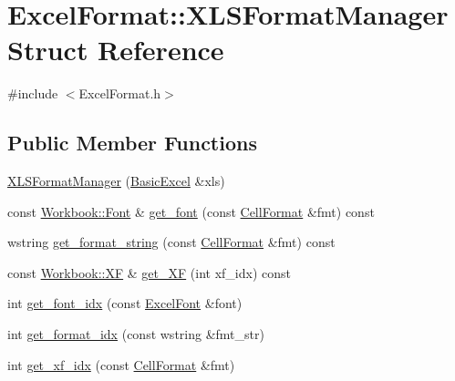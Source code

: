 \hypertarget{struct_excel_format_1_1_x_l_s_format_manager}{}\section{Excel\+Format\+:\+:X\+L\+S\+Format\+Manager Struct Reference}
\label{struct_excel_format_1_1_x_l_s_format_manager}


{\ttfamily \#include $<$Excel\+Format.\+h$>$}

\subsection*{Public Member Functions}
\begin{DoxyCompactItemize}
\item 
\hyperlink{struct_excel_format_1_1_x_l_s_format_manager_af1e5bd0c7eab2aac1d2b4c3cd59f573c}{X\+L\+S\+Format\+Manager} (\hyperlink{class_y_excel_1_1_basic_excel}{Basic\+Excel} \&xls)
\item 
const \hyperlink{struct_y_excel_1_1_workbook_1_1_font}{Workbook\+::\+Font} \& \hyperlink{struct_excel_format_1_1_x_l_s_format_manager_ab6fd9d6dbade5f35a21ee8d38bda32ec}{get\+\_\+font} (const \hyperlink{struct_excel_format_1_1_cell_format}{Cell\+Format} \&fmt) const 
\item 
wstring \hyperlink{struct_excel_format_1_1_x_l_s_format_manager_a3a2442651abc06e742c816760da9406d}{get\+\_\+format\+\_\+string} (const \hyperlink{struct_excel_format_1_1_cell_format}{Cell\+Format} \&fmt) const 
\item 
const \hyperlink{struct_y_excel_1_1_workbook_1_1_x_f}{Workbook\+::\+X\+F} \& \hyperlink{struct_excel_format_1_1_x_l_s_format_manager_a3746bceb822b2313eef790714690fbb0}{get\+\_\+\+X\+F} (int xf\+\_\+idx) const 
\item 
int \hyperlink{struct_excel_format_1_1_x_l_s_format_manager_a887003f3eadff196f95ba8c143c31691}{get\+\_\+font\+\_\+idx} (const \hyperlink{struct_excel_format_1_1_excel_font}{Excel\+Font} \&font)
\item 
int \hyperlink{struct_excel_format_1_1_x_l_s_format_manager_a4815244c4dc356e8aeb7c84273c1010f}{get\+\_\+format\+\_\+idx} (const wstring \&fmt\+\_\+str)
\item 
int \hyperlink{struct_excel_format_1_1_x_l_s_format_manager_a15521924fa22dd8afaf7bd9ef93ae47c}{get\+\_\+xf\+\_\+idx} (const \hyperlink{struct_excel_format_1_1_cell_format}{Cell\+Format} \&fmt)
\item 

\end{DoxyCompactItemize}
